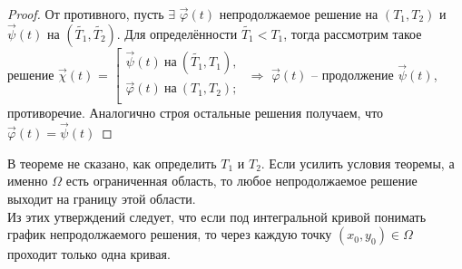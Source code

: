 \begin{proof}
	От противного, пусть $\exists$ $\vec{\varphi}(t)$ непродолжаемое решение на $(T_1, T_2)$ и $\vec{\psi}(t)$ на $(\widetilde{T_1}, \widetilde{T_2})$. Для определённости $\widetilde{T_1} < T_1$, тогда рассмотрим такое решение
	$\vec{\chi}(t)$ = 
	$\left[ 
		\begin{gathered} 
			\vec{\psi}(t)\ \text{на}\ (\widetilde{T_1}, T_1), \\ 
			\vec{\varphi}(t)\ \text{на}\ (T_1, T_2); \\ 
		\end{gathered} 
	\right.$
	$\Rightarrow$ $\vec{\varphi}(t)$  -- продолжение $\vec{\psi}(t)$, противоречие. Аналогично строя остальные решения получаем, что $\vec{\varphi}(t) = \vec{\psi}(t)$ 
\end{proof}

\begin{remark}
	В теореме не сказано, как определить $T_1$ и $T_2$. Если усилить условия теоремы, а именно $\Omega$ есть ограниченная область, то любое непродолжаемое решение выходит на границу этой области.\\
	Из этих утверждений следует, что если под интегральной кривой понимать график непродолжаемого решения, то через каждую точку $(x_0, y_0) \in \Omega$ проходит только одна кривая.
\end{remark}


